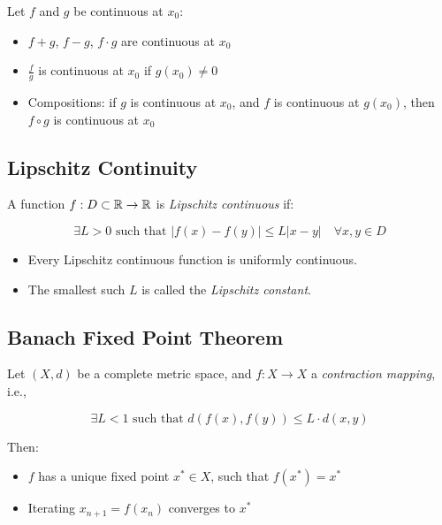 Let \(f\) and \(g\) be continuous at \(x_0\):

\begin{itemize}
    
    \item \(f + g\), \(f - g\), \(f \cdot g\) are continuous at \(x_0\)
    
    \item \(\frac{f}{g}\) is continuous at \(x_0\) if \(g(x_0) \ne 0\)
    
    \item Compositions: if \(g\) is continuous at \(x_0\), and \(f\) is continuous at \(g(x_0)\), 
    then \(f \circ g\) is continuous at \(x_0\)

\end{itemize}

\subsection{Lipschitz Continuity}

A function \(f: D \subset \mathbb{R} \to \mathbb{R}\) is \emph{Lipschitz continuous} if:

\[
    \exists L > 0 \text{ such that } |f(x) - f(y)| \le L |x - y| \quad \forall x, y \in D
\]

\begin{itemize}

    \item Every Lipschitz continuous function is uniformly continuous.

    \item The smallest such \(L\) is called the \emph{Lipschitz constant}.

\end{itemize}

\subsection{Banach Fixed Point Theorem}

Let \((X, d)\) be a complete metric space, and \(f: X \to X\) a \emph{contraction mapping}, i.e.,

\[
    \exists L < 1 \text{ such that } d(f(x), f(y)) \le L \cdot d(x, y)
\]

Then:

\begin{itemize}

    \item \(f\) has a unique fixed point \(x^* \in X\), such that \(f(x^*) = x^*\)

    \item Iterating \(x_{n+1} = f(x_n)\) converges to \(x^*\)

\end{itemize}


